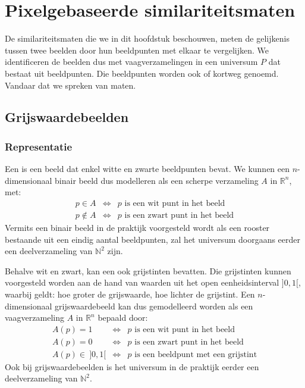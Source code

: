 \chapter{Pixelgebaseerde similariteitsmaten}

De similariteitsmaten die we in dit hoofdstuk beschouwen,
meten de gelijkenis tussen twee beelden door hun beeldpunten met elkaar te vergelijken.
We identificeren de beelden dus met vaagverzamelingen in een universum $P$ dat bestaat uit 
beeldpunten. Die beeldpunten worden ook  of kortweg  genoemd. 
Vandaar dat we spreken van  maten.

\section{Grijswaardebeelden}

\subsection{Representatie}

Een  is een beeld dat enkel witte en zwarte beeldpunten bevat. We kunnen een 
$n$-dimensionaal binair beeld dus modelleren als een scherpe verzameling $A$ in $\mathbb{R}^n$, met:
\begin{displaymath}
\begin{array}{rcl}
p \in A & \iff & p \textrm{ is een wit punt in het beeld} \\
p \notin A & \iff & p \textrm{ is een zwart punt in het beeld}
\end{array}
\end{displaymath}
Vermits een binair beeld in de praktijk voorgesteld wordt als een rooster bestaande uit een
eindig aantal beeldpunten, zal het universum doorgaans eerder een deelverzameling van $\mathbb{N}^2$ zijn.

Behalve wit en zwart, kan een  ook grijstinten bevatten. Die grijstinten
kunnen voorgesteld worden aan de hand van waarden uit het open eenheidsinterval $]0,1[$, waarbij
geldt: hoe groter de grijswaarde, hoe lichter de grijstint. Een $n$-dimensionaal grijswaardebeeld
kan dus gemodelleerd worden als een vaagverzameling $A$ in $\mathbb{R}^n$ bepaald door:
\begin{displaymath}
\begin{array}{rcl}
A(p) = 1 & \iff & p \textrm{ is een wit punt in het beeld} \\
A(p) = 0 & \iff & p \textrm{ is een zwart punt in het beeld} \\
A(p) \in\ ]0,1[ & \iff & p \textrm{ is een beeldpunt met een grijstint}
\end{array}
\end{displaymath}
Ook bij grijswaardebeelden is het universum in de praktijk eerder een deelverzameling van $\mathbb{N}^2$.

